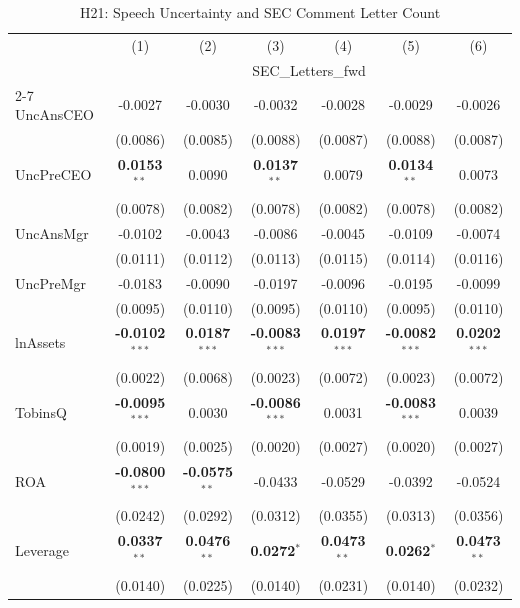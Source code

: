 \begin{landscape}
\begin{table}[H]
\setlength{\tabcolsep}{3pt}
\renewcommand{\arraystretch}{0.85}
\centering
\caption{H21: Speech Uncertainty and SEC Comment Letter Count}
\label{tab:h21}
\scriptsize
\begin{tabular}{lcccccc}
\toprule
 & (1) & (2) & (3) & (4) & (5) & (6) \\
 & \multicolumn{6}{c}{SEC\_Letters\_fwd} \\
\cmidrule(lr){2-7}
\midrule
UncAnsCEO & -0.0027 & -0.0030 & -0.0032 & -0.0028 & -0.0029 & -0.0026 \\
 & (0.0086) & (0.0085) & (0.0088) & (0.0087) & (0.0088) & (0.0087) \\
UncPreCEO & \textbf{0.0153}$^{**}$ & 0.0090 & \textbf{0.0137}$^{**}$ & 0.0079 & \textbf{0.0134}$^{**}$ & 0.0073 \\
 & (0.0078) & (0.0082) & (0.0078) & (0.0082) & (0.0078) & (0.0082) \\
UncAnsMgr & -0.0102 & -0.0043 & -0.0086 & -0.0045 & -0.0109 & -0.0074 \\
 & (0.0111) & (0.0112) & (0.0113) & (0.0115) & (0.0114) & (0.0116) \\
UncPreMgr & -0.0183 & -0.0090 & -0.0197 & -0.0096 & -0.0195 & -0.0099 \\
 & (0.0095) & (0.0110) & (0.0095) & (0.0110) & (0.0095) & (0.0110) \\
\midrule
lnAssets & \textbf{-0.0102}$^{***}$ & \textbf{0.0187}$^{***}$ & \textbf{-0.0083}$^{***}$ & \textbf{0.0197}$^{***}$ & \textbf{-0.0082}$^{***}$ & \textbf{0.0202}$^{***}$ \\
 & (0.0022) & (0.0068) & (0.0023) & (0.0072) & (0.0023) & (0.0072) \\
TobinsQ & \textbf{-0.0095}$^{***}$ & 0.0030 & \textbf{-0.0086}$^{***}$ & 0.0031 & \textbf{-0.0083}$^{***}$ & 0.0039 \\
 & (0.0019) & (0.0025) & (0.0020) & (0.0027) & (0.0020) & (0.0027) \\
ROA & \textbf{-0.0800}$^{***}$ & \textbf{-0.0575}$^{**}$ & -0.0433 & -0.0529 & -0.0392 & -0.0524 \\
 & (0.0242) & (0.0292) & (0.0312) & (0.0355) & (0.0313) & (0.0356) \\
Leverage & \textbf{0.0337}$^{**}$ & \textbf{0.0476}$^{**}$ & \textbf{0.0272}$^{*}$ & \textbf{0.0473}$^{**}$ & \textbf{0.0262}$^{*}$ & \textbf{0.0473}$^{**}$ \\
 & (0.0140) & (0.0225) & (0.0140) & (0.0231) & (0.0140) & (0.0232) \\

\end{tabular}
\end{table}
\end{landscape}
